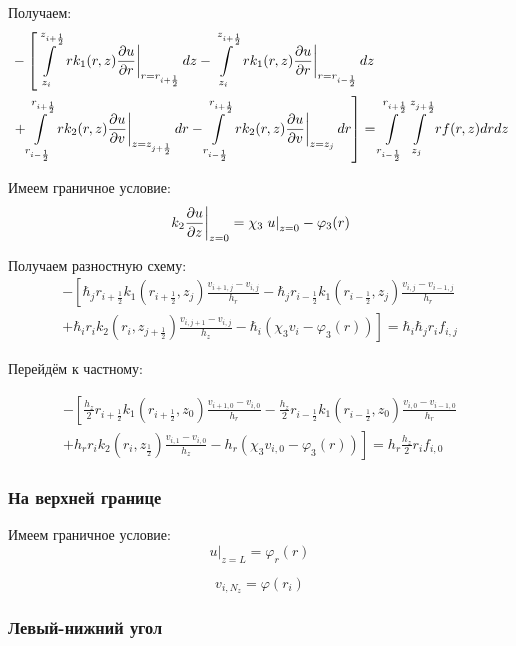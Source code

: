 Получаем:
\begin{align*}
  &- \left [
   \int\limits^{z_{i+\frac{1}{2}}}_{z_{i}}  \left . r k_1(r, z) \pdv{u}{r} \right \vert_{r = r_{i + \frac{1}{2}}} dz
  - \int\limits^{z_{i+\frac{1}{2}}}_{z_{i}} \left . r k_1(r, z) \pdv{u}{r} \right \vert_{r = r_{i - \frac{1}{2}}} dz
  \right . \\
  &\left . + \int\limits^{r_{i+\frac{1}{2}}}_{r_{i-\frac{1}{2}}} \left . rk_2(r, z)\pdv{u}{v} \right \vert_{z = z_{j + \frac{1}{2}}} dr
  - \int\limits^{r_{i+\frac{1}{2}}}_{r_{i-\frac{1}{2}}} \left . rk_2(r, z)\pdv{u}{v} \right \vert_{z = z_{j}} dr
  \right ] = \int\limits^{r_{i +\frac{1}{2}}}_{r_{i -\frac{1}{2}}} \int\limits^{z_{j +\frac{1}{2}}}_{z_{j }} rf(r, z) dr dz
\end{align*}

Имеем граничное условие:
\[
  \left . k_2 \pdv{u}{z} \right \vert_{z=0} = \chi_3 \left . u \right \vert_{z=0} - \varphi_3(r)
\]

Получаем разностную схему:
\begin{align*}
  - \left [ 
  \hbar_j r_{i+\frac{1}{2}} k_1(r_{i+\frac{1}{2}}, z_j) \frac{v_{i+1, j} - v_{i, j}}{h_{r}}
  - \hbar_j r_{i-\frac{1}{2}} k_1(r_{i-\frac{1}{2}}, z_j) \frac{v_{i, j} - v_{i - 1, j}}{h_{r}}
  \right . \\
  \left .
  + \hbar_i r_{i} k_2(r_i, z_{j+\frac{1}{2}}) \frac{v_{i, j + 1} - v_{i, j}}{h_{z}}
  - \hbar_i(\chi_3 v_i - \varphi_3(r))
  \right ]  = \hbar_i \hbar_j r_i f_{i, j}
\end{align*}

Перейдём к частному:

\begin{align*}
  - \left [ 
  \frac{h_z}{2} r_{i+\frac{1}{2}} k_1(r_{i+\frac{1}{2}}, z_0) \frac{v_{i+1, 0} - v_{i, 0}}{h_{r}}
  - \frac{h_z}{2} r_{i-\frac{1}{2}} k_1(r_{i-\frac{1}{2}}, z_0) \frac{v_{i, 0} - v_{i - 1, 0}}{h_{r}}
  \right . \\
  \left .
  + h_r r_{i} k_2(r_i, z_{\frac{1}{2}}) \frac{v_{i, 1} - v_{i, 0}}{h_{z}}
  - h_r(\chi_3 v_{i, 0} - \varphi_3(r))
  \right ]  = h_r \frac{h_z}{2} r_i f_{i, 0}
\end{align*}

\subsubsection{На верхней границе}
Имеем граничное условие:
\[
  \left . u \right \vert_{z=L} = \varphi_r(r) 
\]

\[
  v_{i,N_z} = \varphi(r_i)
\]

\subsubsection{Левый-нижний угол}

